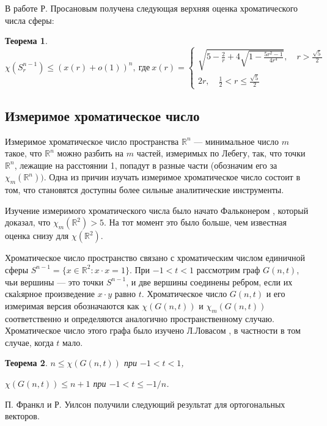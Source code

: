 \documentclass[a4paper,12pt]{article}
\newtheorem{theorem}{Теорема}
\begin{document}
В работе \cite{Pros} Р. Просановым получена следующая верхняя оценка хроматического числа сферы:

 \begin{theorem} \label{10}
\[ \chi(S_r^{n-1}) \leq (x(r)+o(1))^n,\: \text{где} \: x(r) = \begin{cases}\sqrt{5-\frac{2}{r}+4\sqrt{1-\frac{5r^2-1}{4r^4}}}, \quad r > \frac{\sqrt{5}}{2} \\ 

2r, \quad \frac{1}{2} < r \leq  \frac{\sqrt{5}}{2}
\end{cases}\]
\end{theorem}

\subsection{Измеримое хроматическое число}
 Измеримое хроматическое число пространства $\mathbb{R}^n$ --- минимальное число $m$ такое, что $\mathbb{R}^n$ можно разбить на $m$ частей, измеримых по Лебегу, так, что точки $\mathbb{R}^n$, лежащие на расстоянии 1, попадут в разные части (обозначим его за $\chi_m(\mathbb{R}^n))$. Одна из причин изучать измеримое хроматическое число состоит в том, что становятся доступны более сильные аналитические инструменты.
 
 Изучение измеримого хроматического числа было начато Фальконером \cite{Falc}, который доказал, что $\chi_m(\mathbb{R}^2) > 5$. На тот момент это было больше, чем известная оценка снизу для $\chi(\mathbb{R}^2)$.
 
 Хроматическое число пространство связано с хроматическим числом единичной сферы $S^{n-1} = \{x \in \mathbb{R}^2 : x \cdot x = 1\}.$ При $ -1 < t < 1$ рассмотрим граф $G(n,t)$, чьи вершины --- это точки $S^{n-1}$, и две вершины соединены ребром, если их скаkярное произведение $x \cdot y$ равно $t$. Хроматическое число $G(n,t)$ и его измеримая версия обозначаются как $\chi(G(n,t))$ и $\chi_m(G(n,t))$ соответственно и определяются аналогично пространственному случаю.
Хроматическое число этого графа было изучено Л.Ловасом \cite{Lov}, в частности в том случае, когда $t$ мало.


\begin{theorem} \label{11}
$n \leq \chi(G(n,t))$ при $-1 < t < 1$,

$\chi(G(n,t)) \leq n + 1$ при $-1 < t \leq -1/n$.

\end{theorem}

П. Франкл и Р. Уилсон \cite{FrW} получили следующий результат для ортогональных векторов.
\end{document}
